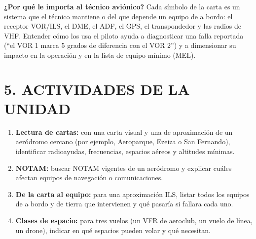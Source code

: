 \begin{recuadro}
\textbf{¿Por qué le importa al técnico aviónico?} Cada símbolo de la carta es un sistema que el
técnico mantiene o del que depende un equipo de a bordo: el receptor VOR/ILS, el DME, el ADF, el
GPS, el transpondedor y las radios de VHF. Entender cómo los usa el piloto ayuda a diagnosticar
una falla reportada (``el VOR 1 marca 5 grados de diferencia con el VOR 2'') y a dimensionar su
impacto en la operación y en la lista de equipo mínimo (MEL).
\end{recuadro}

\section*{5. ACTIVIDADES DE LA UNIDAD}
\begin{enumerate}
  \item \textbf{Lectura de cartas:} con una carta visual y una de aproximación de un aeródromo
        cercano (por ejemplo, Aeroparque, Ezeiza o San Fernando), identificar radioayudas,
        frecuencias, espacios aéreos y altitudes mínimas.
  \item \textbf{NOTAM:} buscar NOTAM vigentes de un aeródromo y explicar cuáles afectan equipos de
        navegación o comunicaciones.
  \item \textbf{De la carta al equipo:} para una aproximación ILS, listar todos los equipos de a
        bordo y de tierra que intervienen y qué pasaría si fallara cada uno.
  \item \textbf{Clases de espacio:} para tres vuelos (un VFR de aeroclub, un vuelo de línea, un
        drone), indicar en qué espacios pueden volar y qué necesitan.
\end{enumerate}
